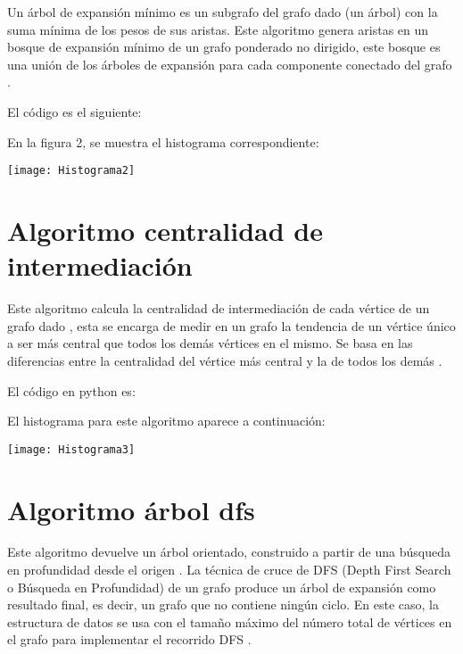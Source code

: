 \documentclass[10pt,a4paper]{article}
\begin{document}
Un árbol de expansión mínimo es un subgrafo del grafo dado (un árbol) con la suma mínima de los pesos de sus aristas. Este algoritmo genera aristas en un bosque de expansión mínimo de un grafo ponderado no dirigido, este bosque es una unión de los árboles de expansión para cada componente conectado del grafo \citep{a2}.\vspace{.4cm}

El código es el siguiente:



En la figura 2, se muestra el histograma correspondiente:

\begin{center}

\texttt{[image: Histograma2]}

\end{center}

\section{Algoritmo centralidad de intermediación}

Este algoritmo calcula la centralidad de intermediación de cada vértice de un grafo dado \cite{a3}, esta se encarga de medir en un grafo la tendencia de un vértice único a ser más central que todos los demás vértices en el mismo. Se basa en las diferencias entre la centralidad del vértice más central y la de todos los demás \cite{a7}.\vspace{.4cm}

El código en python es:



El histograma para este algoritmo aparece a continuación:

\begin{center}

\texttt{[image: Histograma3]}

\end{center} 

\section{Algoritmo árbol dfs}

Este algoritmo devuelve un árbol orientado, construido a partir de una búsqueda en profundidad desde el origen \cite{a4}. 
La técnica de cruce de DFS (Depth First Search o Búsqueda en Profundidad) de un grafo produce un árbol de expansión como resultado final, es decir, un grafo que no contiene ningún ciclo. En este caso, la estructura de datos se usa con el tamaño máximo del número total de vértices en el grafo para implementar el recorrido DFS \cite{a8}.\vspace{.4cm}
\end{document}
